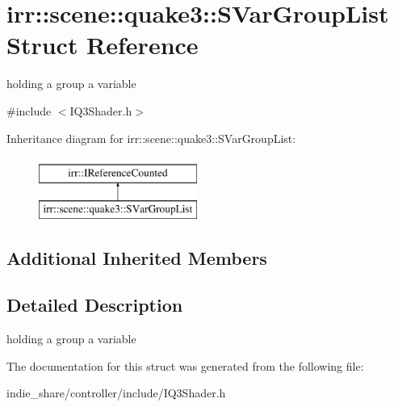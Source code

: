 \hypertarget{structirr_1_1scene_1_1quake3_1_1SVarGroupList}{}\section{irr\+:\+:scene\+:\+:quake3\+:\+:S\+Var\+Group\+List Struct Reference}
\label{structirr_1_1scene_1_1quake3_1_1SVarGroupList}


holding a group a variable  




{\ttfamily \#include $<$I\+Q3\+Shader.\+h$>$}

Inheritance diagram for irr\+:\+:scene\+:\+:quake3\+:\+:S\+Var\+Group\+List\+:\begin{figure}[H]
\begin{center}
\leavevmode
\includegraphics[height=2.000000cm]{structirr_1_1scene_1_1quake3_1_1SVarGroupList}
\end{center}
\end{figure}
\subsection*{Additional Inherited Members}


\subsection{Detailed Description}
holding a group a variable 

The documentation for this struct was generated from the following file\+:\begin{DoxyCompactItemize}
\item 
indie\+\_\+share/controller/include/I\+Q3\+Shader.\+h\end{DoxyCompactItemize}
